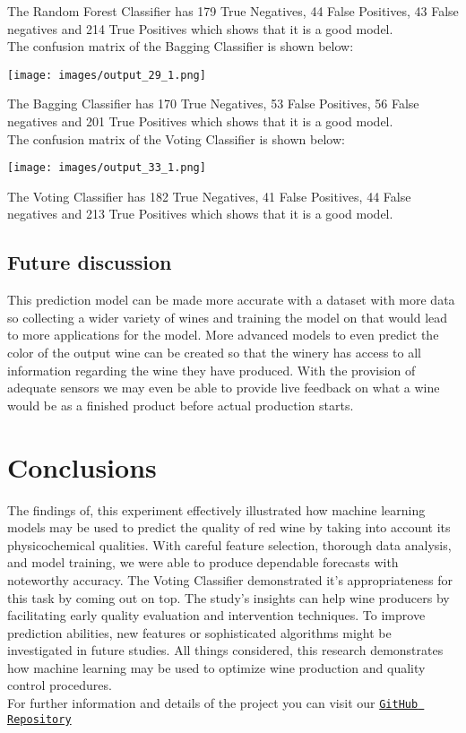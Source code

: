 \documentclass{article}
\begin{document}
The Random Forest Classifier has 179 True Negatives, 44 False Positives, 43 False negatives and 214 True Positives which shows that it is a good model.\\
The confusion matrix of the Bagging Classifier is shown below:\\
\begin{center}
    \texttt{[image: images/output\_29\_1.png]}
\end{center}
    


The Bagging Classifier has 170 True Negatives, 53 False Positives, 56 False negatives and 201 True Positives which shows that it is a good model.\\
The confusion matrix of the Voting Classifier is shown below:\\
\begin{center}
    \texttt{[image: images/output\_33\_1.png]}
\end{center}

The Voting Classifier has 182 True Negatives, 41 False Positives, 44 False negatives and 213 True Positives which shows that it is a good model.\\

\subsection{Future discussion}
This prediction model can be made more accurate with a dataset with more data so collecting a wider variety of wines and training the model on that would lead to more applications for the model.
More advanced models to even predict the color of the output wine can be created so that the winery has access to all information regarding the wine they have produced. With the provision of adequate sensors we may even be able to provide live feedback on what a wine would be as a finished product before actual production starts.

\section{Conclusions}
The findings of, this experiment effectively illustrated how machine learning models may be used to predict the quality of red wine by taking into account its physicochemical qualities. With careful feature selection, thorough data analysis, and model training, we were able to produce dependable forecasts with noteworthy accuracy. The Voting Classifier demonstrated it's appropriateness for this task by coming out on top. The study's insights can help wine producers by facilitating early quality evaluation and intervention techniques. To improve prediction abilities, new features or sophisticated algorithms might be investigated in future studies. All things considered, this research demonstrates how machine learning may be used to optimize wine production and quality control procedures.\\
For further information and details of the project you can visit our \href{https://github.com/VMOnGit/RedWineQuality}{{\texttt{GitHub Repository}}}
\end{document}

